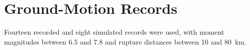 \chapter{Ground-Motion Records}
\label{app:a}

Fourteen recorded and eight simulated records were used, with moment magnitudes between 6.5 and
7.8 and rupture distances between 10 and 80~km.
